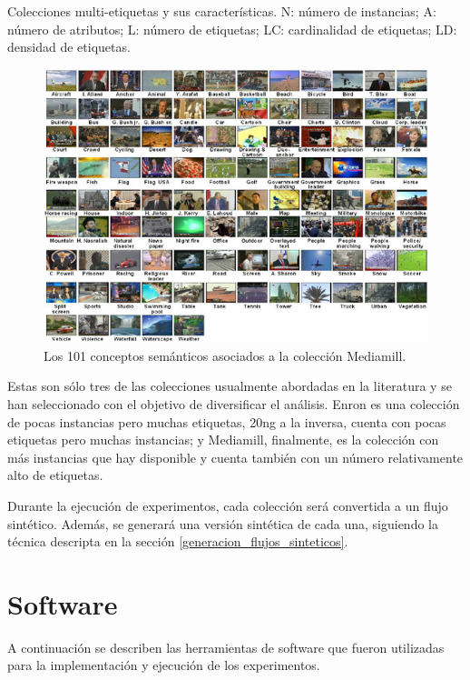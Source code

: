 \begin{table}[htbp]
	\centering
	
	\caption{Colecciones multi-etiquetas y sus características. N: número de
		instancias; A: número de atributos; L: número de etiquetas; LC: cardinalidad
		de etiquetas; LD: densidad de etiquetas.}
	\label{tab:datasets}
\end{table}

\begin{figure}
	\includegraphics[width=.9\linewidth]{figures/mediamill.jpg}
	\centering
	\caption{Los 101 conceptos semánticos asociados a la colección
		Mediamill.}
	\label{fig:mediamill}
\end{figure}

Estas son sólo tres de las colecciones usualmente abordadas en la literatura y
se han seleccionado con el objetivo de diversificar el análisis. Enron es una
colección de pocas instancias pero muchas etiquetas, 20ng a la inversa, cuenta
con pocas etiquetas pero muchas instancias; y Mediamill, finalmente, es la
colección con más instancias que hay disponible y cuenta también con un número
relativamente alto de etiquetas.

Durante la ejecución de experimentos, cada colección será convertida a un flujo
sintético. Además, se generará una versión sintética de cada una, siguiendo la
técnica descripta en la sección \ref{generacion_flujos_sinteticos}.

\section{Software}

A continuación se describen las herramientas de software que fueron utilizadas
para la implementación y ejecución de los experimentos.

